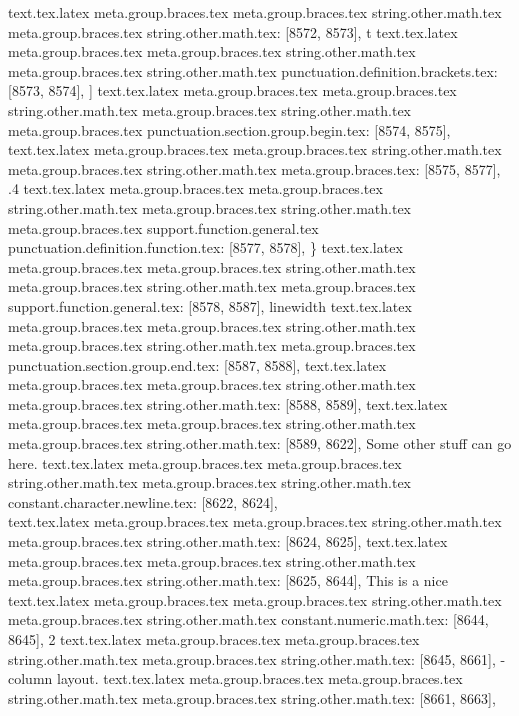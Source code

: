{{{{{{{{{{{{{{{{{{{{{{{{{{{{{{{{{{{{{{{{{{{{{{{{{{{{{{{{{{{{{{{{{{{{{{{{{{{{{{{{{{{{{{{{{{{{{{{{{{{{{{{{{{{{{{{{{{{{{{{{{{{{{{{{{{{{{{{{{{{{{{{{{{{{{{{{{{{{{{{{{{{{{{{{{{{{{{{{{{{{{{{{{{{{{{{{{{{{{{{{{{{{{{{{{{{{{{{{{{{{{{{{{{{{{{{{{{{{{{{{{{{{{{{{{{{{{text.tex.latex meta.group.braces.tex meta.group.braces.tex string.other.math.tex meta.group.braces.tex string.other.math.tex: [8572, 8573], {t}
text.tex.latex meta.group.braces.tex meta.group.braces.tex string.other.math.tex meta.group.braces.tex string.other.math.tex punctuation.definition.brackets.tex: [8573, 8574], {]}
text.tex.latex meta.group.braces.tex meta.group.braces.tex string.other.math.tex meta.group.braces.tex string.other.math.tex meta.group.braces.tex punctuation.section.group.begin.tex: [8574, 8575], {{}
text.tex.latex meta.group.braces.tex meta.group.braces.tex string.other.math.tex meta.group.braces.tex string.other.math.tex meta.group.braces.tex: [8575, 8577], {.4}
text.tex.latex meta.group.braces.tex meta.group.braces.tex string.other.math.tex meta.group.braces.tex string.other.math.tex meta.group.braces.tex support.function.general.tex punctuation.definition.function.tex: [8577, 8578], {\}
text.tex.latex meta.group.braces.tex meta.group.braces.tex string.other.math.tex meta.group.braces.tex string.other.math.tex meta.group.braces.tex support.function.general.tex: [8578, 8587], {linewidth}
text.tex.latex meta.group.braces.tex meta.group.braces.tex string.other.math.tex meta.group.braces.tex string.other.math.tex meta.group.braces.tex punctuation.section.group.end.tex: [8587, 8588], {}}
text.tex.latex meta.group.braces.tex meta.group.braces.tex string.other.math.tex meta.group.braces.tex string.other.math.tex: [8588, 8589], {
}
text.tex.latex meta.group.braces.tex meta.group.braces.tex string.other.math.tex meta.group.braces.tex string.other.math.tex: [8589, 8622], {    Some other stuff can go here.}
text.tex.latex meta.group.braces.tex meta.group.braces.tex string.other.math.tex meta.group.braces.tex string.other.math.tex constant.character.newline.tex: [8622, 8624], {\\}
text.tex.latex meta.group.braces.tex meta.group.braces.tex string.other.math.tex meta.group.braces.tex string.other.math.tex: [8624, 8625], {
}
text.tex.latex meta.group.braces.tex meta.group.braces.tex string.other.math.tex meta.group.braces.tex string.other.math.tex: [8625, 8644], {    This is a nice }
text.tex.latex meta.group.braces.tex meta.group.braces.tex string.other.math.tex meta.group.braces.tex string.other.math.tex constant.numeric.math.tex: [8644, 8645], {2}
text.tex.latex meta.group.braces.tex meta.group.braces.tex string.other.math.tex meta.group.braces.tex string.other.math.tex: [8645, 8661], {-column layout.
}
text.tex.latex meta.group.braces.tex meta.group.braces.tex string.other.math.tex meta.group.braces.tex string.other.math.tex: [8661, 8663], {  }
}}}}}}}}}}}}}}}}}}}}}}}}}}}}}}}}}}}}}}}}}}}}}}}}}}}}}}}}}}}}}}}}}}}}}}}}}}}}}}}}}}}}}}}}}}}}}}}}}}}}}}}}}}}}}}}}}}}}}}}}}}}}}}}}}}}}}}}}}}}}}}}}}}}}}}}}}}}}}}}}}}}}}}}}}}}}}}}}}}}}}}}}}}}}}}}}}}}}}}}}}}}}}}}}}}}}}}}}}}}}}}}}}}}}}}}}}}}}}}}}}}}}}}}}}}}}}}
